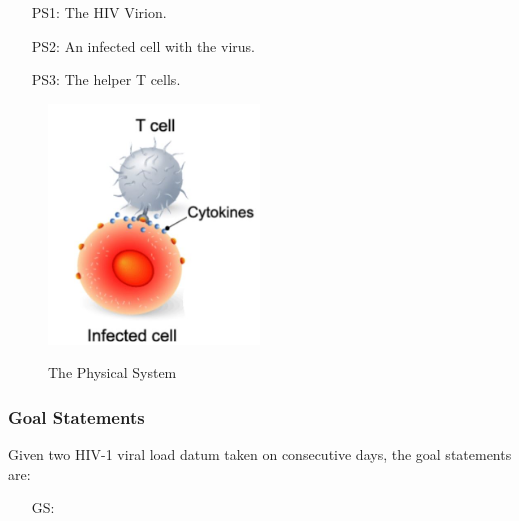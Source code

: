\documentclass[12pt]{article}
\newcounter{goalnum} %
\begin{document}
{


\begin{itemize}

\item[PS1:] The HIV Virion.

\item[PS2:] An infected cell with the virus.

\item[PS3:] The helper T cells. 

\end{itemize}

 \begin{figure}[h!]
 \begin{center}
 {
  \includegraphics[width=0.5\textwidth]{physicalsystem.jpg}
 }
 \caption{ The Physical System}\citep{wikifig}

 \label{Fig_PhysicalSystem}
 \end{center}
 \end{figure}

\subsubsection{Goal Statements}

\noindent Given two HIV-1 viral load datum taken on consecutive days, the goal 
statements are:

\begin{itemize}

\item[GS\refstepcounter{goalnum}\thegoalnum \label{G_determine-decay-rate}:] 


\end{itemize}}
\end{document}
